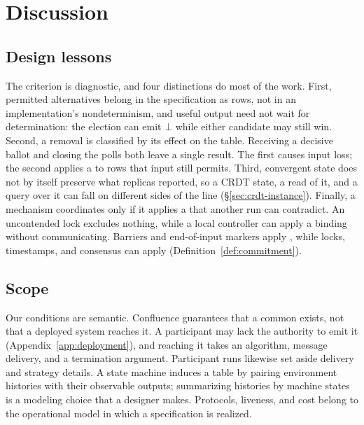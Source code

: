 \section{Discussion}
\label{sec:discussion-old}

\subsection{Design lessons}

The criterion is diagnostic, and four distinctions do most of the work.
First, permitted alternatives belong in the specification as rows, not in an
implementation's nondeterminism, and useful output need not wait for
determination: the election can emit $\bot$ while either candidate may still
win. Second, a removal is classified by its effect on the table. Receiving a
decisive ballot and closing the polls both leave a single result. The first
causes input loss; the second applies a \commitment to rows that input
still permits. Third, convergent state does not by itself preserve what
replicas reported, so a CRDT state, a read of it, and a query over it can fall
on different sides of the line (\S\ref{sec:crdt-instance}). Finally, a
mechanism coordinates only if it applies a \commitment that another run can
contradict. An uncontended lock excludes nothing, while a local controller can
apply a binding \commitment without communicating. Barriers and end-of-input
markers apply \commitments, while locks, timestamps, and consensus can
apply \commitments (Definition~\ref{def:commitment}).

\subsection{Scope}
\label{sec:consistency-as-confluence-old}
\label{sec:design-boundary-old}

Our conditions are semantic. Confluence guarantees that a common \outnoun
exists, not that a deployed system reaches it. A participant may lack the
authority to emit it (Appendix~\ref{app:deployment}), and reaching it takes an
algorithm, message delivery, and a termination argument. Participant runs
likewise set aside delivery and strategy details. A state machine induces a
table by pairing environment histories with their observable outputs;
summarizing histories by machine states is a modeling choice that a designer
makes. Protocols, liveness, and cost belong to the operational model in which
a specification is realized.

